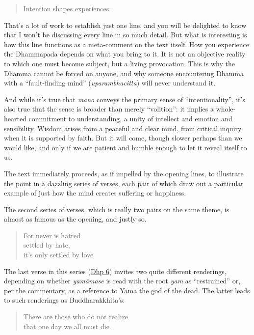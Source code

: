 \documentclass[12pt,openany]{book}%
\begin{document}
\begin{verse}%
Intention shapes experiences.

%
\end{verse}

That’s a lot of work to establish just one line, and you will be delighted to know that I won’t be discussing every line in so much detail. But what is interesting is how this line functions as a meta-comment on the text itself. How you experience the Dhammapada depends on what you bring to it. It is not an objective reality to which one must become subject, but a living provocation. This is why the Dhamma cannot be forced on anyone, and why someone encountering Dhamma with a “fault-finding mind” (\textit{uparambhacitta}) will never understand it.

And while it’s true that \textit{mano} conveys the primary sense of “intentionality”, it’s also true that the sense is broader than merely “volition”: it implies a whole-hearted commitment to understanding, a unity of intellect and emotion and sensibility. Wisdom arises from a peaceful and clear mind, from critical inquiry when it is supported by faith. But it will come, though slower perhaps than we would like, and only if we are patient and humble enough to let it reveal itself to us.

The text immediately proceeds, as if impelled by the opening lines, to illustrate the point in a dazzling series of verses, each pair of which draw out a particular example of just how the mind creates suffering or happiness.

The second series of verses, which is really two pairs on the same theme, is almost as famous as the opening, and justly so.

\begin{verse}%
For never is hatred \\
settled by hate, \\
it’s only settled by love

%
\end{verse}

The last verse in this series (\href{https://suttacentral.net/dhp6/en/sujato}{Dhp 6}) invites two quite different renderings, depending on whether \textit{\textsanskrit{yamāmase}} is read with the root \textit{yam} as “restrained” or, per the commentary, as a reference to Yama the god of the dead. The latter leads to such renderings as Buddharakkhita’s:

\begin{verse}%
There are those who do not realize \\
that one day we all must die.

%
\end{verse}
\end{document}
